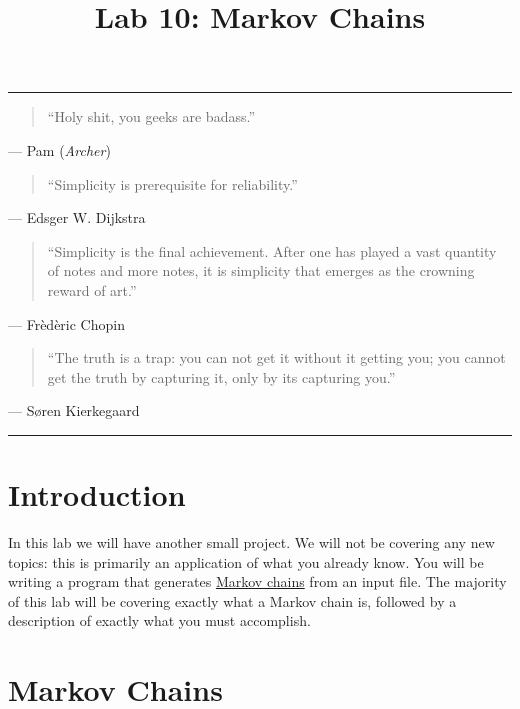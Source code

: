 \documentclass[11pt]{cselabheader}
\title{Lab 10: Markov Chains}
\begin{document}
\maketitle

\hrule
\begin{quotation}
``Holy shit, you geeks are badass.''
\end{quotation}
\begin{flushright}
  --- Pam (\emph{Archer})
\end{flushright}

\begin{quotation}
``Simplicity is prerequisite for reliability.''
\end{quotation}
\begin{flushright}
--- Edsger W. Dijkstra
\end{flushright}

\begin{quotation}
``Simplicity is the final achievement. After one has played a vast quantity of
notes and more notes, it is simplicity that emerges as the crowning reward of
art.''
\end{quotation}
\begin{flushright}
--- Fr\`ed\`eric Chopin
\end{flushright}

\begin{quotation}
``The truth is a trap: you can not get it without it getting you; you cannot get
the truth by capturing it, only by its capturing you.''
\end{quotation}
\begin{flushright}
--- S{\o}ren Kierkegaard
\end{flushright}

\hrule

\section{Introduction}
In this lab we will have another small project. We will not be covering any new
topics: this is primarily an application of what you already know. You will be
writing a program that generates
\href{http://en.wikipedia.org/wiki/Markov_chain}{Markov chains} from an input
file. The majority of this lab will be covering exactly what a Markov chain is,
followed by a description of exactly what you must accomplish.

\section{Markov Chains}
\label{sec:markov}
\end{document}
